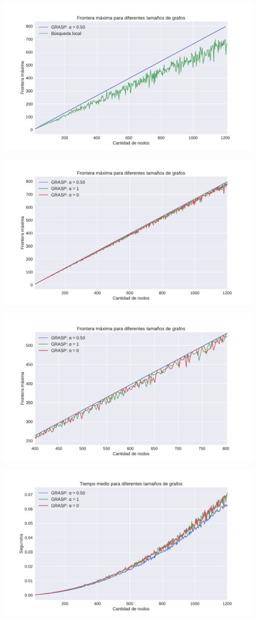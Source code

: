 {\centering
    \includegraphics[width=1\textwidth]{informe/imgs/exp_malo_frontera_grasp_local.pdf}
}

{\centering
    \includegraphics[width=1\textwidth]{informe/imgs/exp_malo_frontera_grasp.pdf}
}

{\centering
    \includegraphics[width=1\textwidth]{informe/imgs/exp_malo_frontera_grasp_zoom.pdf}
}

{\centering
    \includegraphics[width=1\textwidth]{informe/imgs/exp_malo_tiempo_grasp.pdf}
}